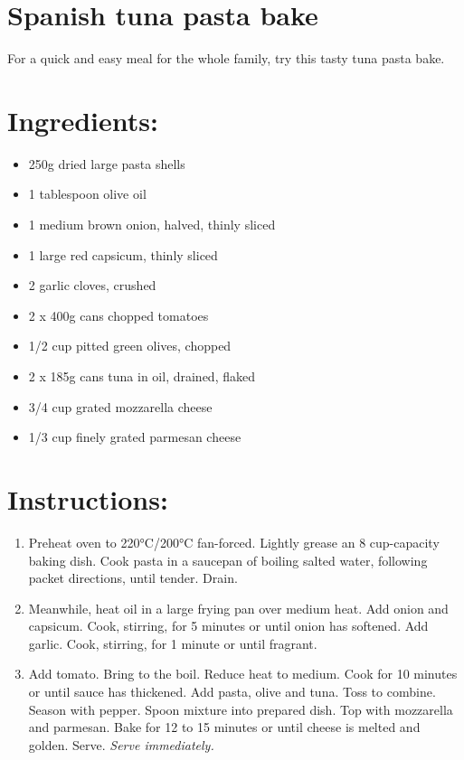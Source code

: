\section{Spanish tuna pasta bake}
For a quick and easy meal for the whole family, try this tasty tuna pasta bake.

\section{Ingredients:}
\begin{itemize}
\item 250g dried large pasta shells 
\item 1 tablespoon olive oil
\item 1 medium brown onion, halved, thinly sliced
\item 1 large red capsicum, thinly sliced
\item 2 garlic cloves, crushed
\item 2 x 400g cans chopped tomatoes
\item 1/2 cup pitted green olives, chopped
\item 2 x 185g cans tuna in oil, drained, flaked
\item 3/4 cup grated mozzarella cheese
\item 1/3 cup finely grated parmesan cheese
\end{itemize}

\section{Instructions:}
\begin{enumerate}
\item Preheat oven to 220°C/200°C fan-forced. Lightly grease an 8 cup-capacity baking dish. Cook pasta in a saucepan of boiling salted water, following packet directions, until tender. Drain.
\item Meanwhile, heat oil in a large frying pan over medium heat. Add onion and capsicum. Cook, stirring, for 5 minutes or until onion has softened. Add garlic. Cook, stirring, for 1 minute or until fragrant.
\item Add tomato. Bring to the boil. Reduce heat to medium. Cook for 10 minutes or until sauce has thickened. Add pasta, olive and tuna. Toss to combine. Season with pepper. Spoon mixture into prepared dish. Top with mozzarella and parmesan. Bake for 12 to 15 minutes or until cheese is melted and golden. Serve.
\emph{Serve immediately.} 

\end{enumerate}
